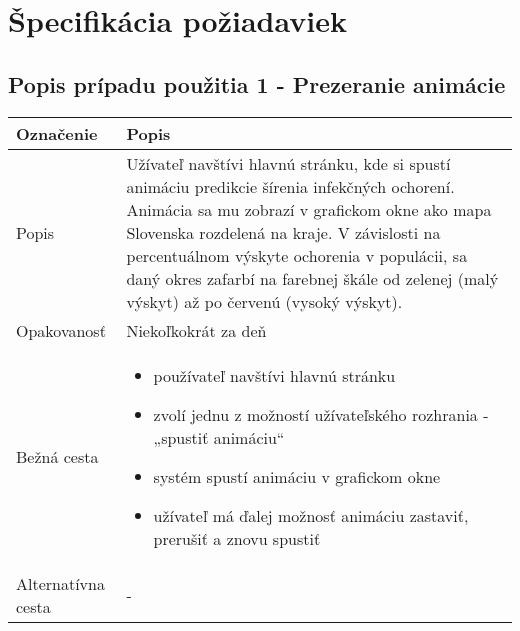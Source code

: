 \documentclass[12pt,a4paper]{report}
\begin{document}
\renewcommand{\chaptername}{}	
\chapter[Špecifikácia požiadaviek]{\rmfamily\bfseries
	Špecifikácia požiadaviek}
\section[Popis prípadu použitia 1 - Prezeranie animácie]{\rmfamily\bfseries
	Popis prípadu použitia 1 - Prezeranie animácie}
\begin{table}[h!]
	\centering
	\begin{tabular}{|>{\centering\arraybackslash}m{3in}|>{\centering\arraybackslash}m{3in}|}
		\hline
		\centering Označenie & Popis \\ [0ex]
		\hline
		Popis & Užívateľ navštívi hlavnú stránku, kde si spustí animáciu predikcie šírenia infekčných ochorení. Animácia sa mu
		zobrazí v grafickom okne ako mapa Slovenska rozdelená na kraje. V závislosti na percentuálnom výskyte ochorenia
		v populácii, sa daný okres zafarbí na farebnej škále od zelenej (malý výskyt) až po červenú (vysoký výskyt).\\ [0ex]
		\hline
		Opakovanosť & Niekoľkokrát za deň \\ [0ex]
		\hline
		Bežná cesta & 	\begin{itemize}
							\item používateľ navštívi hlavnú stránku 
							\item zvolí jednu z možností užívateľského rozhrania - „spustiť animáciu“
							\item systém spustí animáciu v grafickom okne
							\item užívateľ má ďalej možnosť animáciu zastaviť, prerušiť a znovu spustiť
						\end{itemize} \\ [0ex]
		\hline
		Alternatívna cesta & - \\ [0ex]
		\hline
	\end{tabular}
\end{table}
\pagebreak
\end{document}
